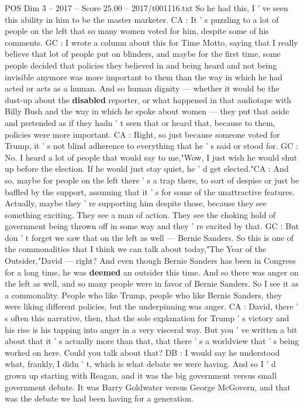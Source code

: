 \begin{textsample}{POS Dim 3 – 2017 – Score 25.00 – 2017/t001116.txt}
So he had this, I ' ve seen this ability in him to be the master marketer.
CA : It ' s puzzling to a lot of people on the left that so many women voted for him, despite some of his comments.
GC : I wrote a column about this for Time Motto, saying that I really believe that lot of people put on blinders, and maybe for the first time, some people decided that policies they believed in and being heard and not being invisible anymore was more important to them than the way in which he had acted or acts as a human.
And so human dignity — whether it would be the dust-up about the \textbf{disabled} reporter, or what happened in that audiotape with Billy Bush and the way in which he spoke about women — they put that aside and pretended as if they hadn ' t seen that or heard that, because to them, policies were more important.
CA : Right, so just because someone voted for Trump, it ' s not blind adherence to everything that he ' s said or stood for.
GC : No.
I heard a lot of people that would say to me,"Wow, I just wish he would shut up before the election.
If he would just stay quiet, he ' d get elected."CA : And so, maybe for people on the left there ' s a trap there, to sort of despise or just be baffled by the support, assuming that it ' s for some of the unattractive features.
Actually, maybe they ' re supporting him despite those, because they see something exciting.
They see a man of action.
They see the choking hold of government being thrown off in some way and they ' re excited by that.
GC : But don ' t forget we saw that on the left as well — Bernie Sanders.
So this is one of the commonalities that I think we can talk about today,"The Year of the Outsider,"David — right?
And even though Bernie Sanders has been in Congress for a long time, he was \textbf{deemed} an outsider this time.
And so there was anger on the left as well, and so many people were in favor of Bernie Sanders.
So I see it as a commonality.
People who like Trump, people who like Bernie Sanders, they were liking different policies, but the underpinning was anger.
CA : David, there ' s often this narrative, then, that the sole explanation for Trump ' s victory and his rise is his tapping into anger in a very visceral way.
But you ' ve written a bit about that it ' s actually more than that, that there ' s a worldview that ' s being worked on here.
Could you talk about that?
DB : I would say he understood what, frankly, I didn ' t, which is what debate we were having.
And so I ' d grown up starting with Reagan, and it was the big government versus small government debate.
It was Barry Goldwater versus George McGovern, and that was the debate we had been having for a generation.

\end{textsample}
